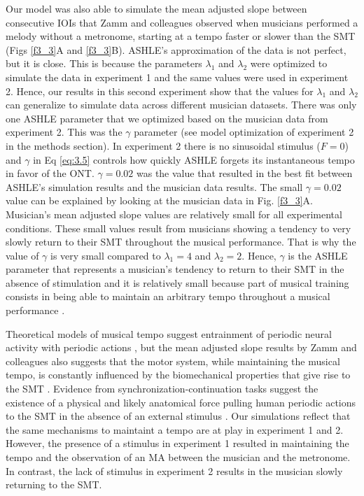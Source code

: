 \documentclass{report}
\begin{document}
Our model was also able to simulate the mean adjusted slope between consecutive IOIs that Zamm and colleagues \cite{zamm2018musicians} observed when musicians performed a melody without a metronome, starting at a tempo faster or slower than the SMT (Figs \ref{f3_3}A and \ref{f3_3}B). ASHLE's approximation of the data is not perfect, but it is close. This is because the parameters $\lambda_1$ and $\lambda_2$ were optimized to simulate the data in experiment 1 and the same values were used in experiment 2. Hence, our results in this second experiment show that the values for $\lambda_1$ and $\lambda_2$ can generalize to simulate data across different musician datasets. There was only one ASHLE parameter that we optimized based on the musician data from experiment 2. This was the $\gamma$ parameter (see model optimization of experiment 2 in the methods section). In experiment 2 there is no sinusoidal stimulus ($F=0$) and $\gamma$ in Eq \eqref{eq:3.5} controls how quickly ASHLE forgets its instantaneous tempo in favor of the ONT. $\gamma = 0.02$ was the value that resulted in the best fit between ASHLE's simulation results and the musician data results. The small $\gamma=0.02$ value can be explained by looking at the musician data in Fig.{} \ref{f3_3}A. Musician's mean adjusted slope values are relatively small for all experimental conditions. These small values result from musicians showing a tendency to very slowly return to their SMT throughout the musical performance. That is why the value of $\gamma$ is very small compared to $\lambda_1=4$ and $\lambda_2=2$. Hence, $\gamma$ is the ASHLE parameter that represents a musician's tendency to return to their SMT in the absence of stimulation and it is relatively small because part of musical training consists in being able to maintain an arbitrary tempo throughout a musical performance \cite{fine2009memory, schultz2019roles}.

Theoretical models of musical tempo suggest entrainment of periodic neural activity with periodic actions \cite{large1999dynamics}, but the mean adjusted slope results by Zamm and colleagues \cite{zamm2018musicians} also suggests that the motor system, while maintaining the musical tempo, is constantly influenced by the biomechanical properties that give rise to the SMT \cite{goodman2000advantages}. Evidence from synchronization-continuation tasks suggest the existence of a physical and likely anatomical force pulling human periodic actions to the SMT in the absence of an external stimulus \cite{yu2003task, mcauley2006time}. Our simulations reflect that the same mechanisms to maintaint a tempo are at play in experiment 1 and 2. However, the presence of a stimulus in experiment 1 resulted in maintaining the tempo and the observation of an MA between the musician and the metronome. In contrast, the lack of stimulus in experiment 2 results in the musician slowly returning to the SMT.
\end{document}

